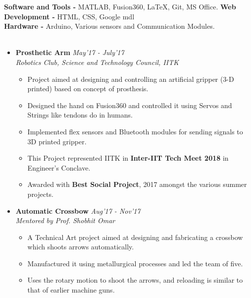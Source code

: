 \textbf{Software and Tools - }  MATLAB, Fusion360, \LaTeX, Git, MS Office. \hspace{.45cm} \textbf{Web Development - } HTML, CSS, Google mdl\\
\textbf{Hardware - } Arduino, Various sensors and Communication Modules.\vspace{.2cm}\\ 
\\[\lsep] \vspace{.2cm}
\begin{itemize}
\item \textbf{Prosthetic Arm} \hfill \textit{May'17 - July'17} \\
 \emph{Robotics Club, Science and Technology Council, IITK} \\[-0.6cm]
	\begin{itemize}\itemsep \isep
	\item Project aimed at designing and controlling an artificial gripper (3-D printed) based on concept of prosthesis.
	\item Designed the hand on Fusion360 and controlled it using Servos and Strings like tendons do in humans.
	\item Implemented flex sensors and Bluetooth modules for sending signals to 3D printed gripper.
	\item This Project represented IITK in \textbf{Inter-IIT Tech Meet 2018} in Engineer's Conclave.
	\item Awarded with \textbf{Best Social Project}, 2017 amongst the various summer projects. 
	\end{itemize}

\item \textbf{Automatic Crossbow} \hfill \textit{Aug'17 - Nov'17} \\
 \emph{Mentored by Prof. Shobhit Omar} \\[-0.6cm]
	\begin{itemize}\itemsep \isep
	\item A Technical Art project aimed at designing and fabricating a crossbow which shoots arrows automatically.
	\item Manufactured it using metallurgical processes and led the team of five.
	\item Uses the rotary motion to shoot the arrows, and reloading is similar to that of earlier machine guns.
	\end{itemize}
\end{itemize}
\\
